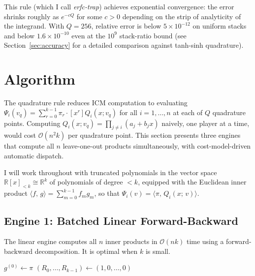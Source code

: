 \documentclass[11pt]{article}
\newcommand{\bigO}{\mathcal{O}}
\newcommand{\ip}[2]{\langle #1,\, #2 \rangle}
\begin{document}
This rule (which I call \emph{erfc-trap}) achieves exponential convergence:
the error shrinks roughly as $e^{-cQ}$ for some $c > 0$ depending on the
strip of analyticity of the integrand. With $Q = 256$, relative error is
below $5 \times 10^{-12}$ on uniform stacks and below $1.6 \times
10^{-10}$ even at the $10^9$ stack-ratio bound (see
Section~\ref{sec:accuracy} for a detailed comparison against
tanh-sinh quadrature).

\section{Algorithm}\label{sec:algorithm}

The quadrature rule reduces ICM computation to evaluating
$\Psi_i(v_q) = \sum_{r=0}^{k-1} \pi_r \cdot [x^r] Q_i(x; v_q)$ for
all $i = 1, \ldots, n$ at each of $Q$ quadrature points. Computing
$Q_i(x; v_q) = \prod_{j \neq i} (a_j + b_j x)$ naively, one player at a
time, would cost $\bigO(n^2 k)$ per quadrature point. This section
presents three engines that compute all $n$ leave-one-out products
simultaneously, with cost-model-driven automatic dispatch.

I will work throughout with truncated polynomials in the vector space
$\mathbb{R}[x]_{<k} \cong \mathbb{R}^k$ of polynomials of degree $<k$,
equipped with the Euclidean inner product
$\ip{f}{g} = \sum_{m=0}^{k-1} f_m g_m$, so that
$\Psi_i(v) = \ip{\pi}{Q_i(x;\, v)}$.

\subsection{Engine 1: Batched Linear Forward-Backward}\label{sec:linear}

The linear engine computes all $n$ inner products in $\bigO(nk)$ time using
a forward-backward decomposition. It is optimal when $k$ is small.

\begin{algorithm}[H]
\caption{Linear Forward-Backward}\label{alg:linear}
\DontPrintSemicolon
\SetAlgoLined
{}
\BlankLine
{}
$g^{(0)} \leftarrow \pi$\;
\BlankLine
{}
$(R_0, \ldots, R_{k-1}) \leftarrow (1, 0, \ldots, 0)$\;
\end{algorithm}
\end{document}
